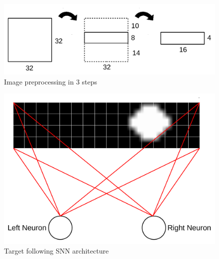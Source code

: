 \begin{frame}
\begin{columns}
\begin{overprint}
				\begin{figure}
					\centering
					\includegraphics[width=\textwidth]{img/img_pre.pdf}
					\caption{Image preprocessing in 3 steps}
					\label{fig:img_pre}
				\end{figure}
				\begin{figure}
					\centering
					\includegraphics[width=\textwidth]{img/arch_tf.pdf}
					\caption{Target following SNN architecture}
					\label{fig:arch_tf}
				\end{figure}
			\end{overprint}
	\end{columns}
\end{frame}

